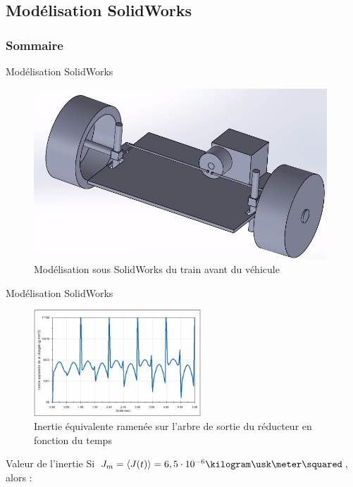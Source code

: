 \documentclass[french, handout]{beamer}
\begin{document}
    \subsection{Modélisation SolidWorks}
    
    \begin{frame}
    \frametitle{Sommaire}
    \tableofcontents[sections=3, currentsubsection]
    \end{frame} 
    
    \begin{frame}{Modélisation SolidWorks}
        \begin{figure}
            \centering
            \includegraphics[width=11cm]{vue_sd_perspective.png}
            \caption{Modélisation sous SolidWorks du train avant du véhicule}
        \end{figure}
    \end{frame}
    \begin{frame}{Modélisation SolidWorks}
        \begin{figure}
            \centering
            \includegraphics[height=4cm]{inertie.png}
            \caption{Inertie équivalente ramenée sur l'arbre de sortie du réducteur en fonction du temps}
        \end{figure}
        \begin{block}{Valeur de l'inertie}
        \centering
            Si $J_m=\langle J(t)\rangle=6,5\cdot10^{-6}\kilogram\usk\meter\squared$, alors :~
        \end{block}
    \end{frame}
    
\end{document}

